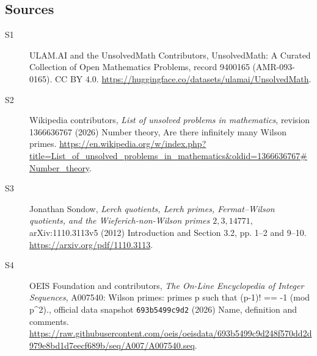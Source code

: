 \documentclass[11pt]{article}
\begin{document}
\subsection{Sources}
\begin{description}
\item[\hypertarget{source:9400165:1}{S1}] ULAM.AI and the UnsolvedMath Contributors, UnsolvedMath: A Curated Collection of Open Mathematics Problems, record 9400165 (AMR-093-0165). CC BY 4.0. \url{https://huggingface.co/datasets/ulamai/UnsolvedMath}.
\item[\hypertarget{source:9400165:2}{S2}] Wikipedia contributors, \emph{List of unsolved problems in mathematics}, revision 1366636767 (2026) Number theory, Are there infinitely many Wilson primes. \url{https://en.wikipedia.org/w/index.php?title=List_of_unsolved_problems_in_mathematics&oldid=1366636767#Number_theory}.
\item[\hypertarget{source:9400165:3}{S3}] Jonathan Sondow, \emph{Lerch quotients, Lerch primes, Fermat--Wilson quotients, and the Wieferich-non-Wilson primes $2,3,14771$}, arXiv:1110.3113v5 (2012) Introduction and Section 3.2, pp. 1--2 and 9--10. \url{https://arxiv.org/pdf/1110.3113}.
\item[\hypertarget{source:9400165:4}{S4}] OEIS Foundation and contributors, \emph{The On-Line Encyclopedia of Integer Sequences}, A007540: Wilson primes: primes p such that (p-1)! == -1 (mod p\textasciicircum{}2)., official data snapshot \texttt{693b5499c9d2} (2026) Name, definition and comments. \url{https://raw.githubusercontent.com/oeis/oeisdata/693b5499c9d248f570dd2d979e8bd1d7eecf689b/seq/A007/A007540.seq}.
\end{description}
\label{end:9400165}
\end{document}
